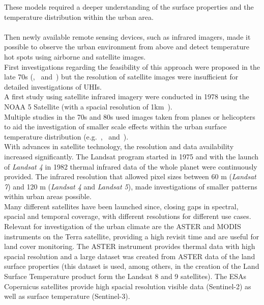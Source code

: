 \documentclass[12pt,a4paper, english,twoside]{scrartcl}
\begin{document}
  These models required a deeper understanding of the surface properties and the temperature distribution within the urban area.\\ \\
  Then newly available remote sensing devices, such as infrared imagers, made it possible to observe the urban environment from above and detect temperature hot spots using airborne and satellite images.  \\
  First investigations regarding the feasibility of this approach were proposed in the late 70s (\cite{Watson1975},~\cite{Carlson1977} and~\cite{Block1978}) but the resolution of satellite images were insufficient for detailed investigations of \glspl{UHI}.\\
  A first study using satellite infrared imagery were conducted in 1978 using the NOAA 5 Satellite (with a spacial resolution of 1km~\autocite{Matson1978}).\\
  Multiple studies in the 70s and 80s used images taken from planes or helicopters to aid the investigation of smaller scale effects within the urban surface temperature distribution (e.g.~\cite{Landsberg1979},~\cite{ljungberg1980use} and~\cite{Foster1981}). \\
  With advances in satellite technology, the resolution and data availability increased significantly. 
  The Landsat program started in 1975 and with the launch of \textit{Landsat 4} in 1982 thermal infrared data of the whole planet were continuously provided. 
  The infrared resolution that allowed pixel sizes between 60 m (\textit{Landsat 7}) and 120 m (\textit{Landsat 4} and \textit{Landsat 5}), made investigations of smaller patterns within urban areas possible.\\
  Many different satellites have been launched since, closing gaps in spectral, spacial and temporal coverage, with different resolutions for different use cases. 
  Relevant for investigation of the urban climate are the ASTER and MODIS instruments on the Terra satellite, providing a high revisit time and are useful for land cover monitoring. 
  The ASTER instrument provides thermal data with high spacial resolution and a large dataset was created from ASTER data of the land surface properties (this dataset is used, among others, in the creation of the Land Surface Temperature product form the Landsat 8 and 9 satellites).
  The \glspl{ESA} Copernicus satellites provide high spacial resolution visible data (Sentinel-2) as well as surface temperature (Sentinel-3).\\
\end{document}
